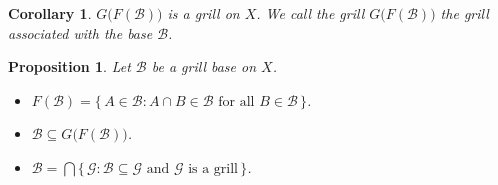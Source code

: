 \documentclass[12pt]{article}
\theoremstyle{plain}
\newtheorem{prop}[thm]{Proposition}
\newtheorem{cor}[thm]{Corollary}
\theoremstyle{definition}
\newcommand{\calB}{\mathcal{B}}
\newcommand{\calG}{\mathcal{G}}
\begin{document}
\begin{cor}
  $G\bigl(F(\calB)\bigr)$ is a grill on $X$.
  We call the grill $G\bigl(F(\calB)\bigr)$ the \textsl{grill associated with the base $\calB$}.
\end{cor}

\begin{prop}
  \label{prop:GrillB}
  Let $\calB$ be a grill base on $X$.
  \begin{itemize}
    \item[(a)] $F(\calB) = \{\, A \in \calB : \mbox{$A \cap B \in \calB$ for all $B \in \calB$} \,\}$.

    \item[(b)] $\calB \subseteq G\bigl(F(\calB)\bigr)$.

    \item[(c)] $\calB = \bigcap\{\, \calG : \mbox{$\calB \subseteq \calG$ and $\calG$ is a grill} \,\}$.
  \end{itemize}
\end{prop}
\end{document}
